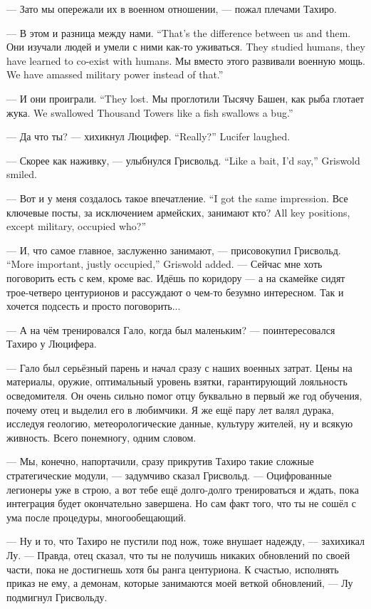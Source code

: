 --- Зато мы опережали их в военном отношении, --- пожал плечами Тахиро.

{--- В этом и разница между нами.}
{``That's the difference between us and them.}
{Они изучали людей и умели с ними как-то уживаться.}
{They studied humans, they have learned to co-exist with humans.}
{Мы вместо этого развивали военную мощь.}
{We have amassed military power instead of that.''}

{--- И они проиграли.}
{``They lost.}
{Мы проглотили Тысячу Башен, как рыба глотает жука.}
{We swallowed Thousand Towers like a fish swallows a bug.''}

{--- Да что ты? --- хихикнул Люцифер.}
{``Really?'' Lucifer laughed.}

{--- Скорее как наживку, --- улыбнулся Грисвольд.}
{``Like a bait, I'd say,'' Griswold smiled.}

{--- Вот и у меня создалось такое впечатление.}
{``I got the same impression.}
{Все ключевые посты, за исключением армейских, занимают кто?}
{All key positions, except military, occupied who?''}

{--- И, что самое главное, заслуженно занимают, --- присовокупил Грисвольд.}
{``More important, justly occupied,'' Griswold added.}
--- Сейчас мне хоть поговорить есть с кем, кроме вас.
Идёшь по коридору --- а на скамейке сидят трое-четверо центурионов и рассуждают о чем-то безумно интересном.
Так и хочется подсесть и просто поговорить...

--- А на чём тренировался Гало, когда был маленьким? --- поинтересовался Тахиро у Люцифера.

--- Гало был серьёзный парень и начал сразу с наших военных затрат.
Цены на материалы, оружие, оптимальный уровень взятки, гарантирующий лояльность осведомителя.
Он очень сильно помог отцу буквально в первый же год обучения, почему отец и выделил его в любимчики.
Я же ещё пару лет валял дурака, исследуя геологию, метеорологические данные, культуру жителей, ну и всякую живность.
Всего понемногу, одним словом.

--- Мы, конечно, напортачили, сразу прикрутив Тахиро такие сложные стратегические модули, --- задумчиво сказал Грисвольд.
--- Оцифрованные легионеры уже в строю, а вот тебе ещё долго-долго тренироваться и ждать, пока интеграция будет окончательно завершена.
Но сам факт того, что ты не сошёл с ума после процедуры, многообещающий.

--- Ну и то, что Тахиро не пустили под нож, тоже внушает надежду, --- захихикал Лу.
--- Правда, отец сказал, что ты не получишь никаких обновлений по своей части, пока не достигнешь хотя бы ранга центуриона.
К счастью, исполнять приказ не ему, а демонам, которые занимаются моей веткой обновлений, --- Лу подмигнул Грисвольду.

